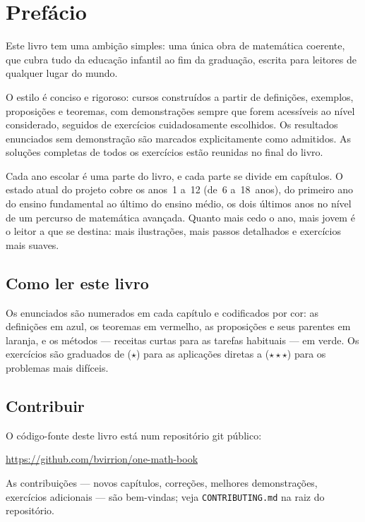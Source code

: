 \chapter{Prefácio}

Este livro tem uma ambição simples: uma única obra de matemática
coerente, que cubra tudo da educação infantil ao fim da graduação,
escrita para leitores de qualquer lugar do mundo.

O estilo é conciso e rigoroso: cursos construídos a partir de
definições, exemplos, proposições e teoremas, com demonstrações
sempre que forem acessíveis ao nível considerado, seguidos de
exercícios cuidadosamente escolhidos. Os resultados enunciados sem
demonstração são marcados explicitamente como admitidos. As soluções
completas de todos os exercícios estão reunidas no final do livro.

Cada ano escolar é uma parte do livro, e cada parte se divide em
capítulos. O estado atual do projeto cobre os anos~1 a~12 (de~6
a~18~anos), do primeiro ano do ensino fundamental ao último do
ensino médio, os dois últimos anos no nível de um percurso de
matemática avançada. Quanto mais cedo o ano, mais jovem é o leitor a
que se destina: mais ilustrações, mais passos detalhados e exercícios
mais suaves.

\section*{Como ler este livro}

Os enunciados são numerados em cada capítulo e codificados por
cor: as definições em azul, os teoremas em vermelho, as proposições
e seus parentes em laranja, e os métodos --- receitas curtas para as
tarefas habituais --- em verde. Os exercícios são graduados de
($\star$) para as aplicações diretas a ($\star\star\star$) para os
problemas mais difíceis.

\section*{Contribuir}

O código-fonte deste livro está num repositório git público:
\begin{center}
\url{https://github.com/bvirrion/one-math-book}
\end{center}
As contribuições --- novos capítulos, correções, melhores
demonstrações, exercícios adicionais --- são bem-vindas; veja
\texttt{CONTRIBUTING.md} na raiz do repositório.
